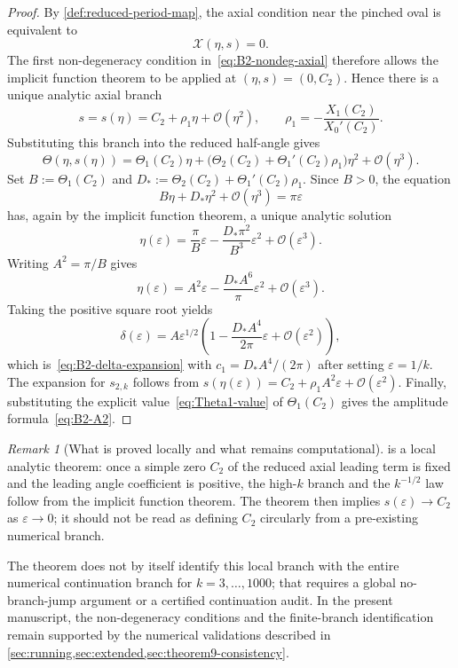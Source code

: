 \documentclass[11pt,a4paper]{article}
\theoremstyle{plain}
\theoremstyle{definition}
\theoremstyle{remark}
\newtheorem{remark}[theorem]{Remark}
\newcommand{\Oo}{\mathcal{O}}
\begin{document}
\begin{proof}
By \cref{def:reduced-period-map}, the axial condition near the
pinched oval is equivalent to
\[
  \mathcal X(\eta,s)=0 .
\]
The first non-degeneracy condition in~\eqref{eq:B2-nondeg-axial}
therefore allows the implicit function theorem to be applied at
$(\eta,s)=(0,C_2)$.  Hence there is a unique analytic axial branch
\[
  s=s(\eta)=C_2+\rho_1\eta+\Oo(\eta^2),
  \qquad
  \rho_1=-\frac{X_1(C_2)}{X_0'(C_2)} .
\]
Substituting this branch into the reduced half-angle gives
\[
  \Theta(\eta,s(\eta))
  =
  \Theta_1(C_2)\eta
  +\bigl(\Theta_2(C_2)+\Theta_1'(C_2)\rho_1\bigr)\eta^2
  +\Oo(\eta^3).
\]
Set $B:=\Theta_1(C_2)$ and $D_*:=\Theta_2(C_2)+\Theta_1'(C_2)\rho_1$.
Since $B>0$, the equation
\[
  B\eta+D_*\eta^2+\Oo(\eta^3)=\pi\varepsilon
\]
has, again by the implicit function theorem, a unique analytic
solution
\[
  \eta(\varepsilon)
  =
  \frac{\pi}{B}\varepsilon
  -\frac{D_*\pi^2}{B^3}\varepsilon^2
  +\Oo(\varepsilon^3).
\]
Writing $A^2=\pi/B$ gives
\[
  \eta(\varepsilon)
  =A^2\varepsilon
  -\frac{D_*A^6}{\pi}\varepsilon^2
  +\Oo(\varepsilon^3).
\]
Taking the positive square root yields
\[
  \delta(\varepsilon)
  =A\varepsilon^{1/2}
  \left(1-\frac{D_*A^4}{2\pi}\varepsilon
  +\Oo(\varepsilon^2)\right),
\]
which is~\eqref{eq:B2-delta-expansion} with
$c_1=D_*A^4/(2\pi)$ after setting $\varepsilon=1/k$.  The expansion
for $s_{2,k}$ follows from
$s(\eta(\varepsilon))=C_2+\rho_1A^2\varepsilon+\Oo(\varepsilon^2)$.
Finally, substituting the explicit value~\eqref{eq:Theta1-value} of
$\Theta_1(C_2)$ gives the amplitude formula~\eqref{eq:B2-A2}.
\end{proof}

\begin{remark}[What is proved locally and what remains computational]
\label{rem:B2-status}
 is a local analytic theorem: once a
simple zero $C_2$ of the reduced axial leading term is fixed and the
leading angle coefficient is positive, the high-$k$ branch and the
$k^{-1/2}$ law follow from the implicit function theorem.  The theorem
then implies $s(\varepsilon)\to C_2$ as $\varepsilon\to0$; it should
not be read as defining $C_2$ circularly from a pre-existing numerical
branch.

The theorem does not by itself identify this local branch with the
entire numerical continuation branch for $k=3,\ldots,1000$; that
requires a global no-branch-jump argument or a certified continuation
audit.  In the present manuscript, the non-degeneracy conditions and
the finite-branch identification remain supported by the numerical
validations described in
\cref{sec:running,sec:extended,sec:theorem9-consistency}.
\end{remark}
\end{document}
